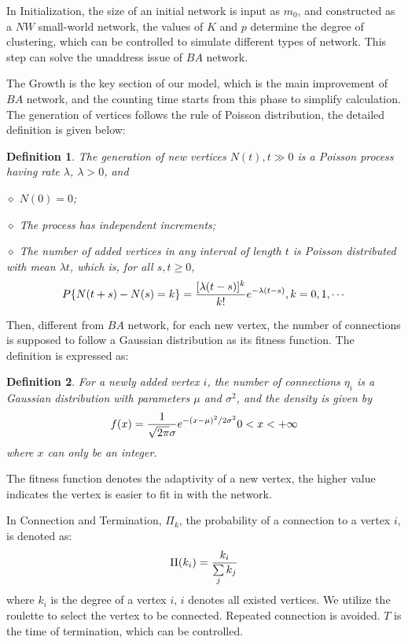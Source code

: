 \documentclass[final]{IEEEtran}
\begin{document}
In Initialization, the size of an initial network is input as
$m_{0}$, and constructed as a $NW$ small-world network, the values
of $K$ and $p$ determine the degree of clustering, which can be
controlled to simulate different types of network. This step can
solve the unaddress issue of $BA$ network.

The Growth is the key section of our model, which is the main
improvement of $BA$ network, and the counting time starts from
this phase to simplify calculation. The generation of vertices
follows the rule of Poisson distribution, the detailed definition
is given below:

\newtheorem{myDef}{Definition}
\begin{myDef}\label{d1} The generation of new vertices ${N(t), t\gg0}$
is a Poisson process having rate $\lambda$, $\lambda>0$, and

\noindent$\diamond$ $N(0)=0$;

\noindent$\diamond$ The process has independent increments;

\noindent$\diamond$ The number of added vertices in any interval
of length $t$ is Poisson distributed with mean $\lambda t$, which
is, for all $s, t\geq0$,
\begin{equation}\footnotesize
P\{N(t+s)-N(s)=k\}=\frac{[\lambda(t-s)]^{k}}{k!}e^{-\lambda(t-s)},
k=0,1,\cdots
\end{equation}
\end{myDef}
\phantom{blahblah}



Then, different from $BA$ network, for each new vertex, the number
of connections is supposed to follow a Gaussian distribution as
its fitness function. The definition is expressed as:

\begin{myDef}\label{d2} For a newly added vertex
$i$, the number of connections $\eta_{i}$ is a Gaussian
distribution with parameters $\mu$ and $\sigma^{2}$, and the
density is given by
\begin{equation}\footnotesize
f(x)=\frac{1}{\sqrt{2\pi}\sigma}e^{-(x-\mu)^{2}/2\sigma^{2}}
0<x<+\infty
\end{equation}
where $x$ can only be an integer.
\end{myDef}


The fitness function denotes the adaptivity of a new vertex, the
higher value indicates the vertex is easier to fit in with the
network.

In Connection and Termination,  $\Pi_{k}$, the probability of a
connection to a vertex $i$, is denoted as:
\begin{equation}\label{e1}\footnotesize
\Pi(k_{i})=\frac{k_{i}}{\sum \limits_{j}k_{j}}
\end{equation}
where $k_{i}$ is the degree of a vertex $i$, $i$ denotes all
existed vertices. We utilize the roulette to select the vertex to
be connected. Repeated connection is avoided. $T$ is the time of
termination, which can be controlled.
\end{document}
